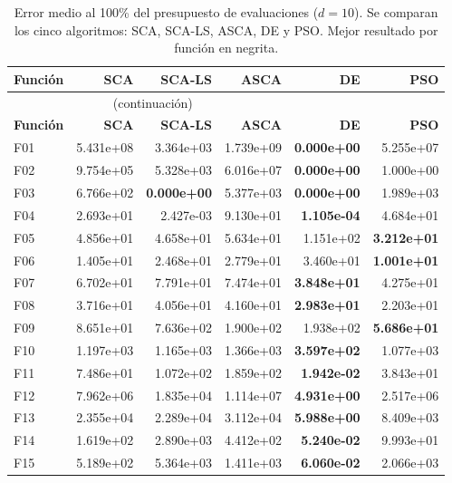 \documentclass[12pt,a4paper]{article}
\begin{document}
\begin{longtable}{lrrrrr}
\caption{Error medio al 100\% del presupuesto de evaluaciones ($d=10$). Se comparan los cinco algoritmos: SCA, SCA-LS, ASCA, DE y PSO. Mejor resultado por función en negrita.}
\label{tab:resultados_sca_ls_d10}\\
\toprule
\textbf{Función} & \textbf{SCA} & \textbf{SCA-LS} & \textbf{ASCA} & \textbf{DE} & \textbf{PSO}\\
\midrule
\endfirsthead
\multicolumn{4}{c}{\tablename~\thetable{} (continuación)}\\
\toprule
\textbf{Función} & \textbf{SCA} & \textbf{SCA-LS} & \textbf{ASCA} & \textbf{DE} & \textbf{PSO}\\
\midrule
\endhead
\midrule
\endfoot
\bottomrule
\endlastfoot
F01  & 5.431e+08 & 3.364e+03 & 1.739e+09 & \textbf{0.000e+00} & 5.255e+07 \\
F02  & 9.754e+05 & 5.328e+03 & 6.016e+07 & \textbf{0.000e+00} & 1.000e+00 \\
F03  & 6.766e+02 & \textbf{0.000e+00} & 5.377e+03 & \textbf{0.000e+00} & 1.989e+03 \\
F04  & 2.693e+01 & 2.427e-03 & 9.130e+01 & \textbf{1.105e-04} & 4.684e+01 \\
F05  & 4.856e+01 & 4.658e+01 & 5.634e+01 & 1.151e+02 & \textbf{3.212e+01} \\
F06  & 1.405e+01 & 2.468e+01 & 2.779e+01 & 3.460e+01 & \textbf{1.001e+01} \\
F07  & 6.702e+01 & 7.791e+01 & 7.474e+01 & \textbf{3.848e+01} & 4.275e+01 \\
F08  & 3.716e+01 & 4.056e+01 & 4.160e+01 & \textbf{2.983e+01} & 2.203e+01 \\
F09  & 8.651e+01 & 7.636e+02 & 1.900e+02 & 1.938e+02 & \textbf{5.686e+01} \\
F10  & 1.197e+03 & 1.165e+03 & 1.366e+03 & \textbf{3.597e+02} & 1.077e+03 \\
F11  & 7.486e+01 & 1.072e+02 & 1.859e+02 & \textbf{1.942e-02} & 3.843e+01 \\
F12  & 7.962e+06 & 1.835e+04 & 1.114e+07 & \textbf{4.931e+00} & 2.517e+06 \\
F13  & 2.355e+04 & 2.289e+04 & 3.112e+04 & \textbf{5.988e+00} & 8.409e+03 \\
F14  & 1.619e+02 & 2.890e+03 & 4.412e+02 & \textbf{5.240e-02} & 9.993e+01 \\
F15  & 5.189e+02 & 5.364e+03 & 1.411e+03 & \textbf{6.060e-02} & 2.066e+03 \\

\end{longtable}
\end{document}
